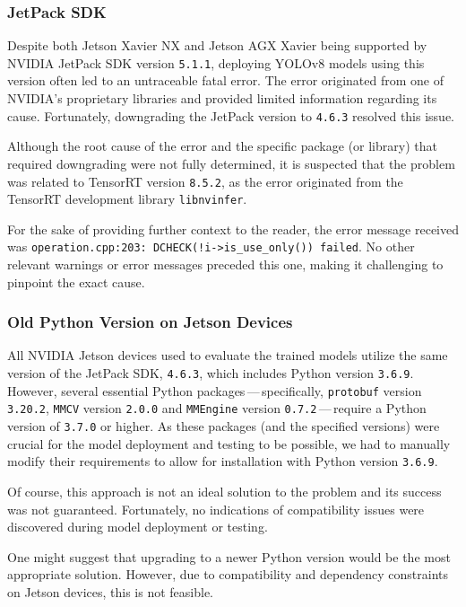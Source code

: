 \subsubsection*{JetPack SDK}

Despite both Jetson Xavier NX and Jetson AGX Xavier being supported by NVIDIA
JetPack SDK version \texttt{5.1.1}, deploying YOLOv8 models using this version
often led to an untraceable fatal error. The error originated from one of
NVIDIA's proprietary libraries and provided limited information regarding its
cause. Fortunately, downgrading the JetPack version to \texttt{4.6.3} resolved
this issue.

Although the root cause of the error and the specific package (or library) that
required downgrading were not fully determined, it is suspected that the problem
was related to TensorRT version \texttt{8.5.2}, as the error originated from the
TensorRT development library \texttt{libnvinfer}.

For the sake of providing further context to the reader, the error message
received was \verb|operation.cpp:203: DCHECK(!i->is_use_only()) failed|. No
other relevant warnings or error messages preceded this one, making it
challenging to pinpoint the exact cause.


\subsubsection*{Old Python Version on Jetson Devices}

All NVIDIA Jetson devices used to evaluate the trained models utilize the same
version of the JetPack SDK, \texttt{4.6.3}, which includes Python version
\texttt{3.6.9}. However, several essential Python packages\,---\,specifically,
\texttt{protobuf} version \texttt{3.20.2}, \texttt{MMCV} version \texttt{2.0.0}
and \texttt{MMEngine} version \texttt{0.7.2}\,---\,require a Python version of
\texttt{3.7.0} or higher. As these packages (and the specified versions) were
crucial for the model deployment and testing to be possible, we had to manually
modify their requirements to allow for installation with Python version
\texttt{3.6.9}.

Of course, this approach is not an ideal solution to the problem and its success
was not guaranteed.  Fortunately, no indications of compatibility issues were
discovered during model deployment or testing.

One might suggest that upgrading to a newer Python version would be the most
appropriate solution. However, due to compatibility and dependency constraints
on Jetson devices, this is not feasible.

